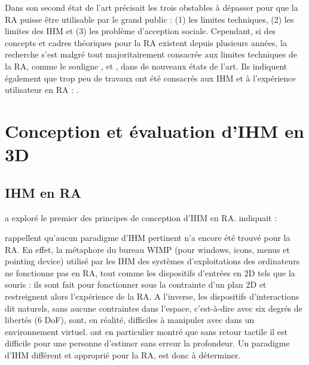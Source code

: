 



Dans son second état de l'art \cite{Azuma2001} précisait les trois obstables à dépasser pour que la RA puisse être utilisable par le grand public : (1) les limites techniques, (2) les limites des IHM et (3) les problème d'acception sociale. Cependant, si des concepts et cadres théoriques pour la RA existent depuis plusieurs années, la recherche s'est malgré tout majoritairement consacrée aux limites techniques de la RA, comme le souligne \cite{Zhou2008}, \cite{VanKrevelen2010} et \cite{Billinghurst2015}, dans de nouveaux états de l'art. Ils indiquent également que trop peu de travaux ont été consacrés aux IHM et à l'expérience utilisateur en RA : .


\section{Conception et évaluation d'IHM en 3D}
\subsection{IHM en RA}
\cite{Billinghurst2005} a exploré le premier des principes de conception d'IHM en RA. indiquait : 

\citet{VanKrevelen2010} rappellent qu'aucun paradigme d'IHM pertinent n'a encore été trouvé pour la RA. En effet, la métaphore du bureau WIMP (pour \foreignlanguage{english}{windows}, \foreignlanguage{english}{icons}, \foreignlanguage{english}{menus} et \foreignlanguage{english}{pointing device}) utilisé par les IHM des systèmes d'exploitations des ordinateurs ne fonctionne pas en RA, tout comme les dispositifs d'entrées en 2D tels que la souris : ils sont fait pour fonctionner sous la contrainte d'un plan 2D et restreignent alors l'expérience de la RA. \citep{VanKrevelen2010} A l'inverse, les dispositifs d'interactions dit naturels, sans aucune contraintes dans l'espace, c'est-à-dire avec six degrés de libertés (6 DoF), sont, en réalité, difficiles à manipuler avec dans un environnement virtuel. \citet{ChanKaoChenEtAl2010} ont en particulier montré que sans retour tactile il est difficile pour une personne d'estimer sans erreur la profondeur. Un paradigme d'IHM différent et approprié pour la RA, est donc à déterminer.

